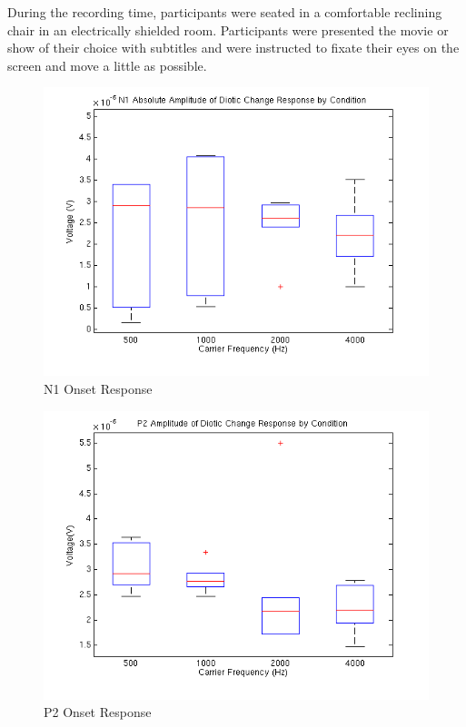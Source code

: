 \documentclass[12pt,journal,compsoc,twocolumn]{IEEEtran}
\begin{document}
During the recording time, participants were seated in a comfortable reclining chair in an electrically shielded room. Participants were presented the movie or show of their choice with subtitles and were instructed to fixate their eyes on the screen and move a little as possible.
\begin{figure}[t]
\centering
\includegraphics[width=3.5 in]{box_diotic_N1}
\caption{N1 Onset Response}
\label{fig:box_diotic_N1}
\end{figure}

\begin{figure}[t]
\centering
\includegraphics[width=3.5 in]{box_diotic_P2}
\caption{P2 Onset Response}
\label{fig:box_diotic_P2}
\end{figure}
\end{document}
